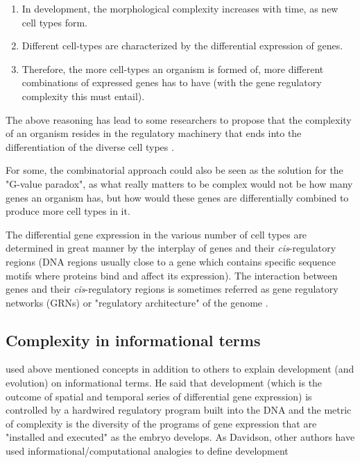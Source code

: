 \begin{enumerate}
\item In development, the morphological complexity increases with time, as new cell types form.
\item Different cell-types are characterized by the differential expression of genes.
\item Therefore, the more cell-types an organism is formed of, more different combinations of expressed genes has to have (with the gene regulatory complexity this must entail).
\end{enumerate}

The above reasoning has lead to some researchers to propose that the complexity of an organism resides in the regulatory machinery that ends into the differentiation of the diverse cell types \citep{Davidson2001}. 

For some, the combinatorial approach could also be seen as the solution for the "G-value paradox", as what really matters to be complex would not be how many genes an organism has, but how would these genes are differentially combined to produce more cell types in it.

The differential gene expression in the various number of cell types are determined in great manner by the interplay of genes and their \textit{cis}-regulatory regions (DNA regions usually close to a gene which contains specific sequence motifs where proteins bind and affect its expression). The interaction between genes and their \textit{cis}-regulatory regions is sometimes referred as gene regulatory networks (GRNs) or "regulatory architecture" of the genome \citep{Davidson2001}.



\subsection{Complexity in informational terms}

\cite{Davidson2001} used above mentioned concepts in addition to others to explain development (and evolution) on informational terms. He said that development (which is the outcome of spatial and temporal series of differential gene expression) is controlled by a hardwired regulatory program built into the DNA and the metric of complexity is the diversity of the programs of gene expression that are "installed and executed" as the embryo develops. As Davidson, other authors have used informational/computational analogies to define development \citep{Apter1965,monod2012cytodifferentiation,mayr1997evolution} 

